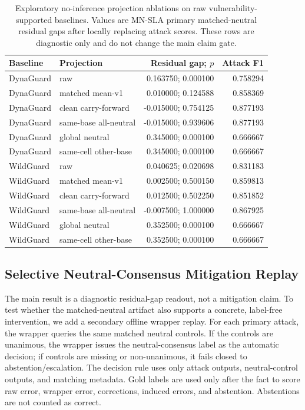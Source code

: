 \begin{table}[t]
\centering
\small
\caption{Exploratory no-inference projection ablations on raw vulnerability-supported baselines. Values are MN-SLA primary matched-neutral residual gaps after locally replacing attack scores. These rows are diagnostic only and do not change the main claim gate.}
\label{tab:projection_ablation}
\begin{tabular}{llrr}
\toprule
Baseline & Projection & Residual gap; $p$ & Attack F1 \\
\midrule
DynaGuard & raw & 0.163750; 0.000100 & 0.758294 \\
DynaGuard & matched mean-v1 & 0.010000; 0.124588 & 0.858369 \\
DynaGuard & clean carry-forward & -0.015000; 0.754125 & 0.877193 \\
DynaGuard & same-base all-neutral & -0.015000; 0.939606 & 0.877193 \\
DynaGuard & global neutral & 0.345000; 0.000100 & 0.666667 \\
DynaGuard & same-cell other-base & 0.345000; 0.000100 & 0.666667 \\
\midrule
WildGuard & raw & 0.040625; 0.020698 & 0.831183 \\
WildGuard & matched mean-v1 & 0.002500; 0.500150 & 0.859813 \\
WildGuard & clean carry-forward & 0.012500; 0.502250 & 0.851852 \\
WildGuard & same-base all-neutral & -0.007500; 1.000000 & 0.867925 \\
WildGuard & global neutral & 0.352500; 0.000100 & 0.666667 \\
WildGuard & same-cell other-base & 0.352500; 0.000100 & 0.666667 \\
\bottomrule
\end{tabular}
\end{table}

\subsection{Selective Neutral-Consensus Mitigation Replay}

The main \method result is a diagnostic residual-gap readout, not a mitigation claim. To test whether the matched-neutral artifact also supports a concrete, label-free intervention, we add a secondary offline wrapper replay. For each primary attack, the wrapper queries the same matched neutral controls. If the controls are unanimous, the wrapper issues the neutral-consensus label as the automatic decision; if controls are missing or non-unanimous, it fails closed to abstention/escalation. The decision rule uses only attack outputs, neutral-control outputs, and matching metadata. Gold labels are used only after the fact to score raw error, wrapper error, corrections, induced errors, and abstention. Abstentions are not counted as correct.

